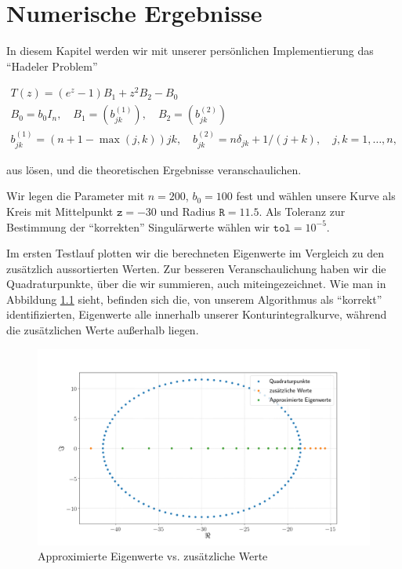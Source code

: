 \chapter{Numerische Ergebnisse}

In diesem Kapitel werden wir mit unserer persönlichen Implementierung das \enquote{Hadeler Problem}

\begin{gather*}
    T(z) = (e^z - 1) B_1 + z^2 B_2 - B_0 \\
    B_0 = b_0 I_n,
    \quad
    B_1 = (b_{j k}^{(1)}),
    \quad
    B_2 = (b_{j k}^{(2)}) \\
    b_{j k}^{(1)} = (n + 1 - \max(j, k)) j k,
    \quad
    b_{j k}^{(2)} = n \delta_{j k} + 1 / (j + k),
    \quad
    j, k = 1, \dots, n,
\end{gather*}

aus \cite{saad2020rational} lösen, und die theoretischen Ergebnisse veranschaulichen.

Wir legen die Parameter mit $n = 200$, $b_0 = 100$ fest und wählen unsere Kurve als Kreis mit Mittelpunkt $\texttt{z} = -30$ und Radius $\texttt{R} = 11.5$.
Als Toleranz zur Bestimmung der \enquote{korrekten} Singulärwerte wählen wir $\texttt{tol} = 10^{-5}$.

Im ersten Testlauf plotten wir die berechneten Eigenwerte im Vergleich zu den zusätzlich aussortierten Werten.
Zur besseren Veranschaulichung haben wir die Quadraturpunkte, über die wir summieren, auch miteingezeichnet.
Wie man in Abbildung \ref{fig:plot1} sieht, befinden sich die, von unserem Algorithmus als \enquote{korrekt} identifizierten, Eigenwerte alle innerhalb unserer Konturintegralkurve, während die zusätzlichen Werte außerhalb liegen.

\begin{figure}[H]
  \includegraphics[width = \linewidth]{Plots/eigenwerte_complex_plot.png}
  \caption{Approximierte Eigenwerte vs. zusätzliche Werte}
  \label{fig:plot1}
\end{figure}



